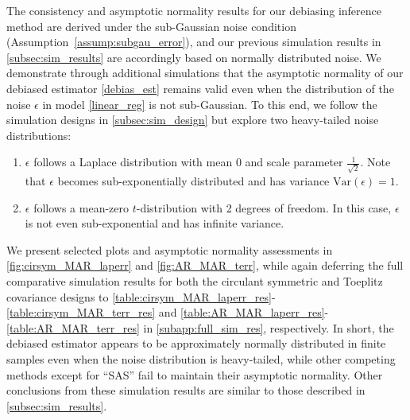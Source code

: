 \documentclass[ejsv2,noshowframe]{imsart}
\theoremstyle{plain}
\theoremstyle{definition}
\theoremstyle{remark}
\begin{document}
The consistency and asymptotic normality results for our debiasing inference method are derived under the sub-Gaussian noise condition (Assumption~\ref{assump:subgau_error}), and our previous simulation results in \autoref{subsec:sim_results} are accordingly based on normally distributed noise. We demonstrate through additional simulations that the asymptotic normality of our debiased estimator \eqref{debias_est} remains valid even when the distribution of the noise $\epsilon$ in model \eqref{linear_reg} is not sub-Gaussian. To this end, we follow the simulation designs in \autoref{subsec:sim_design} but explore two heavy-tailed noise distributions:
\begin{enumerate}[label=(\roman*)]
	\item $\epsilon$ follows a Laplace distribution with mean 0 and scale parameter $\frac{1}{\sqrt{2}}$. Note that $\epsilon$ becomes sub-exponentially distributed and has variance $\mathrm{Var}(\epsilon)=1$. 
	
	\item $\epsilon$ follows a mean-zero $t$-distribution with 2 degrees of freedom. In this case, $\epsilon$ is not even sub-exponential and has infinite variance. 
\end{enumerate}
We present selected plots and asymptotic normality assessments in \autoref{fig:cirsym_MAR_laperr} and \autoref{fig:AR_MAR_terr}, while again deferring the full comparative simulation results for both the circulant symmetric and Toeplitz covariance designs to \autoref{table:cirsym_MAR_laperr_res}-\ref{table:cirsym_MAR_terr_res} and \autoref{table:AR_MAR_laperr_res}-\ref{table:AR_MAR_terr_res} in \autoref{subapp:full_sim_res}, respectively. In short, the debiased estimator appears to be approximately normally distributed in finite samples even when the noise distribution is heavy-tailed, while other competing methods except for ``SAS'' fail to maintain their asymptotic normality. Other conclusions from these simulation results are similar to those described in \autoref{subsec:sim_results}.

\end{document}

